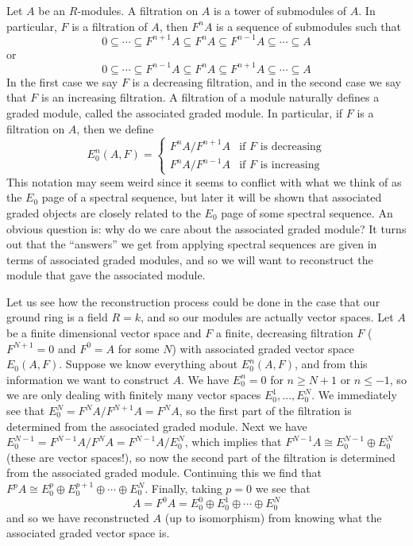Let $A$ be an $R$-modules. A filtration on $A$ is a tower of submodules of $A$. In particular, $F$ is a filtration of $A$, then $F^n A$ is a sequence of submodules such that 
\[ 0 \subseteq \cdots \subseteq F^{n+1} A \subseteq F^n A \subseteq F^{n-1} A \subseteq \cdots \subseteq A \]
or
\[ 0 \subseteq \cdots \subseteq F^{n-1} A \subseteq F^n A \subseteq F^{n+1} A \subseteq \cdots \subseteq A \]
In the first case we say $F$ is a decreasing filtration, and in the second case we say that $F$ is an increasing filtration. A filtration of a module naturally defines a graded module, called the associated graded module. In particular, if $F$ is a filtration on $A$, then we define
\[ E_0^n(A,F) = \begin{cases} F^n A / F^{n+1} A & \text{if $F$ is decreasing} \\ F^n A / F^{n-1} A & \text{if $F$ is increasing} \end{cases} \]
This notation may seem weird since it seems to conflict with what we think of as the $E_0$ page of a spectral sequence, but later it will be shown that associated graded objects are closely related to the $E_0$ page of some spectral sequence. An obvious question is: why do we care about the associated graded module? It turns out that the ``answers'' we get from applying spectral sequences are given in terms of associated graded modules, and so we will want to reconstruct the module that gave the associated module.

Let us see how the reconstruction process could be done in the case that our ground ring is a field $R = k$, and so our modules are actually vector spaces. Let $A$ be a finite dimensional vector space and $F$ a finite, decreasing filtration $F$ ($F^{N+1}=0$ and $F^0=A$ for some $N$) with associated graded vector space $E_0(A,F)$. Suppose we know everything about $E_0^n(A,F)$, and from this information we want to construct $A$. We have $E_0^n = 0$ for $n \geq N+1$ or $n \leq -1$, so we are only dealing with finitely many vector spaces $E_0^1, \ldots, E_0^N$. We immediately see that $E_0^N = F^N A/F^{N+1} A = F^N A$, so the first part of the filtration is determined from the associated graded module. Next we have $E_0^{N-1} = F^{N-1} A / F^N A = F^{N-1} A / E_0^N$, which implies that $F^{N-1} A \cong E_0^{N-1} \oplus E_0^N$ (these are vector spaces!), so now the second part of the filtration is determined from the associated graded module. Continuing this we find that $F^p A \cong E_0^p \oplus E_0^{p+1} \oplus \cdots \oplus E_0^N$. Finally, taking $p=0$ we see that
\[ A = F^0 A = E_0^0 \oplus E_0^1 \oplus \cdots \oplus E_0^N \]
and so we have reconstructed $A$ (up to isomorphism) from knowing what the associated graded vector space is. 

